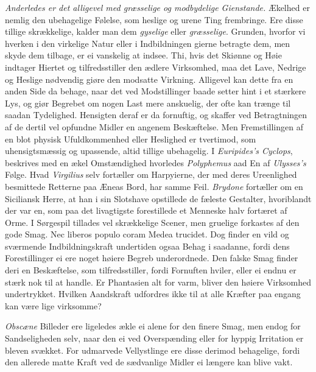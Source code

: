 \documentclass[12pt,a4paper]{article}
\newcommand{\opage}[1]{\marginnote{\footnotesize\textit{[#1]}}}
\begin{document}
\emph{Anderledes er det alligevel med græsselige og modbydelige Gienstande.} Ækelhed er
nemlig den ubehagelige Følelse, som heslige og urene Ting frembringe. Ere disse tillige
skrækkelige, kalder man dem \emph{gyselige} eller \emph{græsselige}. Grunden, hvorfor vi
hverken i den virkelige Natur eller i Indbildningen gierne betragte dem, men skyde dem
tilbage, er ei vanskelig at indsee. Thi, hvis det Skiønne og Høie indtager Hiertet og
tilfredsstiller den ædlere Virksomhed, maa det Lave, Nedrige og Heslige nødvendig giøre den
\opage{242} modsatte Virkning. Alligevel kan dette fra en anden Side da behage, naar det ved
Modstillinger baade setter hint i et stærkere Lys, og giør Begrebet om nogen Last mere
anskuelig, der ofte kan trænge til saadan Tydelighed. Hensigten deraf er da fornuftig, og
skaffer ved Betragtningen af de dertil vel opfundne Midler en angenem Beskæftelse. Men
Fremstillingen af en blot physisk Ufuldkommenhed eller Heslighed er tvertimod, som
uhensigtsmæssig og upassende, altid tillige ubehagelig. I \emph{Euripides's Cyclops},
beskrives med en ækel Omstændighed hvorledes \emph{Polyphemus} aad En af
\emph{Ulysses's} Følge. Hvad \emph{Virgilius} selv fortæller om Harpyierne, der med deres
Ureenlighed besmittede Retterne paa Æneas Bord, har samme Feil. \emph{Brydone} fortæller om
en Siciliansk Herre, at han i sin Slotshave opstillede de fæleste Gestalter, hvoriblandt der
var en, som paa det livagtigste forestillede et Menneske halv fortæret af Orme. I Sørgespil
tillades vel skrækkelige Scener, men gruelige forkastes af den gode Smag. Nec liberos
populo coram Medea trucidet. Dog finder en vild og sværmende Indbildningskraft undertiden
ogsaa Behag i saadanne, fordi dens Forestillinger ei ere noget høiere Begreb underordnede.
Den falske Smag finder deri en Beskæftelse, som tilfredsstiller, fordi Fornuften hviler,
eller ei endnu er stærk nok til at handle. Er Phantasien alt for varm, bliver den høiere
Virksomhed undertrykket. Hvilken Aandskraft
\opage{243} udfordres ikke til at alle Kræfter paa engang kan være lige virksomme?

\emph{Obscæne} Billeder ere ligeledes ækle ei alene for den finere Smag, men endog for
Sandseligheden selv, naar den ei ved Overspænding eller for hyppig Irritation er bleven
svækket. For udmarvede Vellystlinge ere disse derimod behagelige, fordi den allerede matte
Kraft ved de sædvanlige Midler ei længere kan blive vakt.
\end{document}

